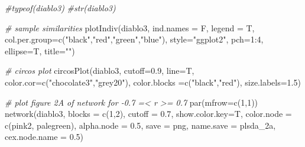 \documentclass[
]{article}
\newenvironment{Shaded}{\begin{snugshade}}{\end{snugshade}}
\newcommand{\AttributeTok}[1]{\textcolor[rgb]{0.77,0.63,0.00}{#1}}
\newcommand{\CommentTok}[1]{\textcolor[rgb]{0.56,0.35,0.01}{\textit{#1}}}
\newcommand{\DecValTok}[1]{\textcolor[rgb]{0.00,0.00,0.81}{#1}}
\newcommand{\FloatTok}[1]{\textcolor[rgb]{0.00,0.00,0.81}{#1}}
\newcommand{\FunctionTok}[1]{\textcolor[rgb]{0.00,0.00,0.00}{#1}}
\newcommand{\NormalTok}[1]{#1}
\newcommand{\SpecialCharTok}[1]{\textcolor[rgb]{0.00,0.00,0.00}{#1}}
\newcommand{\StringTok}[1]{\textcolor[rgb]{0.31,0.60,0.02}{#1}}
\begin{document}
\begin{Shaded}
\begin{Highlighting}[]
\CommentTok{\#typeof(diablo3)}
\CommentTok{\#str(diablo3)}

\CommentTok{\# sample similarities}
\FunctionTok{plotIndiv}\NormalTok{(diablo3, }\AttributeTok{ind.names =}\NormalTok{ F, }\AttributeTok{legend =}\NormalTok{ T,}
          \AttributeTok{col.per.group=}\FunctionTok{c}\NormalTok{(}\StringTok{"black"}\NormalTok{,}\StringTok{"red"}\NormalTok{,}\StringTok{"green"}\NormalTok{,}\StringTok{"blue"}\NormalTok{), }\AttributeTok{style=}\StringTok{"ggplot2"}\NormalTok{,}
          \AttributeTok{pch=}\DecValTok{1}\SpecialCharTok{:}\DecValTok{4}\NormalTok{,  }\AttributeTok{ellipse=}\NormalTok{T, }\AttributeTok{title=}\StringTok{""}\NormalTok{)}

\CommentTok{\# circos plot }
\FunctionTok{circosPlot}\NormalTok{(diablo3, }\AttributeTok{cutoff=}\FloatTok{0.9}\NormalTok{, }\AttributeTok{line=}\NormalTok{T, }\AttributeTok{color.cor=}\FunctionTok{c}\NormalTok{(}\StringTok{"chocolate3"}\NormalTok{,}\StringTok{"grey20"}\NormalTok{),}
          \AttributeTok{color.blocks =}\FunctionTok{c}\NormalTok{(}\StringTok{"black"}\NormalTok{,}\StringTok{"red"}\NormalTok{), }\AttributeTok{size.labels=}\FloatTok{1.5}\NormalTok{)}

\CommentTok{\# plot figure 2A of network for {-}0.7 =\textless{} r \textgreater{}= 0.7}
\FunctionTok{par}\NormalTok{(}\AttributeTok{mfrow=}\FunctionTok{c}\NormalTok{(}\DecValTok{1}\NormalTok{,}\DecValTok{1}\NormalTok{))}
\FunctionTok{network}\NormalTok{(diablo3, }\AttributeTok{blocks =} \FunctionTok{c}\NormalTok{(}\DecValTok{1}\NormalTok{,}\DecValTok{2}\NormalTok{), }\AttributeTok{cutoff =} \FloatTok{0.7}\NormalTok{, }\AttributeTok{show.color.key=}\NormalTok{T, }
        \AttributeTok{color.node =} \FunctionTok{c}\NormalTok{(}\StringTok{\textquotesingle{}pink2\textquotesingle{}}\NormalTok{, }\StringTok{\textquotesingle{}palegreen\textquotesingle{}}\NormalTok{), }\AttributeTok{alpha.node =} \FloatTok{0.5}\NormalTok{,}
        \AttributeTok{save =} \StringTok{\textquotesingle{}png\textquotesingle{}}\NormalTok{, }\AttributeTok{name.save =} \StringTok{\textquotesingle{}plsda\_2a\textquotesingle{}}\NormalTok{, }\AttributeTok{cex.node.name =} \FloatTok{0.5}\NormalTok{)}


\end{Highlighting}
\end{Shaded}
\end{document}
